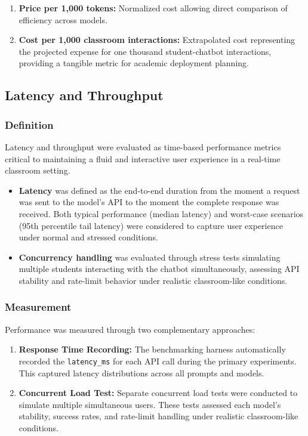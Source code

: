 \begin{enumerate}
    \item \textbf{Price per 1,000 tokens:} Normalized cost allowing direct comparison of efficiency across models.
    \item \textbf{Cost per 1,000 classroom interactions:} Extrapolated cost representing the projected expense for one thousand student-chatbot interactions, providing a tangible metric for academic deployment planning.
\end{enumerate}

\subsection{Latency and Throughput}
\label{subsec:latency_throughput}

\subsubsection{Definition}
\label{subsubsec:latency_definition}
Latency and throughput were evaluated as time-based performance metrics critical to maintaining a fluid and interactive user experience in a real-time classroom setting.

\begin{itemize}
    \item \textbf{Latency} was defined as the end-to-end duration from the moment a request was sent to the model's API to the moment the complete response was received. Both typical performance (median latency) and worst-case scenarios (95th percentile tail latency) were considered to capture user experience under normal and stressed conditions.
    \item \textbf{Concurrency handling} was evaluated through stress tests simulating multiple students interacting with the chatbot simultaneously, assessing API stability and rate-limit behavior under realistic classroom-like conditions.
\end{itemize}

\subsubsection{Measurement}
\label{subsubsec:latency_measurement}
Performance was measured through two complementary approaches:

\begin{enumerate}
    \item \textbf{Response Time Recording:} The benchmarking harness automatically recorded the \verb|latency_ms| for each API call during the primary experiments. This captured latency distributions across all prompts and models.
    \item \textbf{Concurrent Load Test:} Separate concurrent load tests were conducted to simulate multiple simultaneous users. These tests assessed each model's stability, success rates, and rate-limit handling under realistic classroom-like conditions.
\end{enumerate}

